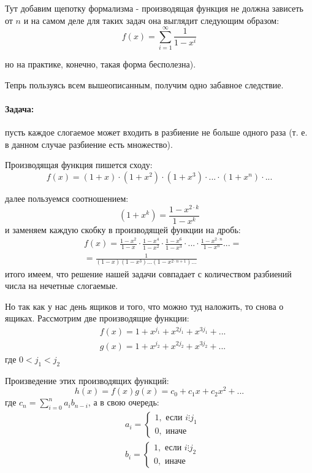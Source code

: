 Тут добавим щепотку формализма - производящая функция не должна зависеть от $n$ и на самом деле для таких задач она выглядит следующим образом:
\[
	f\left(x\right) = \sum_{i=1}^{\infty} \frac{1}{1 - x^i}
\]

но на практике, конечно, такая форма бесполезна).

Тепрь пользуясь всем вышеописанным, получим одно забавное следствие.

\paragraph{Задача:} пусть каждое слогаемое может входить в разбиение не больше одного раза (т. е. в данном случае разбиение есть множество).

Производящая функция пишется сходу:
\[
	f\left(x\right)=\left(1+x\right)\cdot\left(1+x^2\right)\cdot\left(1+x^3\right)\cdot...\cdot\left(1+x^n\right)\cdot...
\]

далее пользуемся соотношением:
\[
	\left(1+x^k\right) = \frac{1-x^{2\cdot k}}{1 - x^k}
\]
и заменяем каждую скобку в производящей функции на дробь:
\[
	\begin{split}
		&f\left(x\right) = \frac{1-x^2}{1-x}\cdot\frac{1-x^4}{1-x^2}\cdot\frac{1-x^6}{1-x^3}\cdot...\cdot\frac{1-x^{2\cdot n}}{1 - x^n}... = \\
		& = \frac{1}{\left(1-x\right)\left(1-x^3\right)...\left(1-x^{2\cdot n+1}\right)...}
	\end{split}
\]
итого имеем, что решение нашей задачи совпадает с количеством разбиений числа на нечетные слогаемые.

Но так как у нас день ящиков и того, что можно туд наложить, то снова о ящиках. Рассмотрим две производящие функции:
\[
	\begin{split}
		& f\left(x\right) = 1+x^{j_1}+x^{2j_1}+x^{3j_1}+...\\
		& g\left(x\right) = 1+x^{j_2}+x^{2j_2}+x^{3j_2}+...
	\end{split}
\]
где $0 < j_1 < j_2$

Произведение этих производящих функций:
\[
	h\left(x\right) = f\left(x\right)g\left(x\right) = c_0 + c_1x + c_2x^2 + ...
\]
где $c_n = \sum_{i=0}^n a_ib_{n-i}$, а в свою очередь:
\[
	\begin{split}
		& a_i = \begin{cases}1, \text{ если } i \vdots j_1 \\ 0, \text{ иначе }\end{cases} \\
		& b_i = \begin{cases}1, \text{ если } i \vdots j_2 \\ 0, \text{ иначе }\end{cases}
	\end{split}
\]

